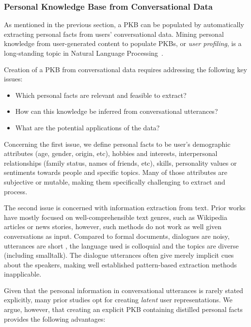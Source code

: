 \subsubsection{Personal Knowledge Base from Conversational Data}

As mentioned in the previous section, a PKB can be populated by automatically extracting personal facts from users' conversational data. Mining personal knowledge from user-generated content to populate PKBs, or \emph{user profiling}, is a long-standing topic in Natural Language Processing~\cite{flekova:ACL16:long,basile:2017}.

Creation of a PKB from conversational data requires addressing the following key issues:

\begin{itemize}
    \item Which personal facts are relevant and feasible to extract?
    \item How can this knowledge be inferred from conversational utterances?
    \item What are the potential applications of the data?
\end{itemize}

Concerning the first issue, we define personal facts to be user's demographic attributes (age, gender, origin, etc), hobbies and interests, interpersonal relationships (family status, names of friends, etc), skills, personality values or sentiments towards people and specific topics. Many of those attributes are subjective or mutable, making them specifically challenging to extract and process.

The second issue is concerned with information extraction from text. Prior works have mostly focused on well-comprehensible text genres,
such as Wikipedia articles or news stories, however, such methods do not work as well given conversations as input.
Compared to formal documents, dialogues are noisy, utterances are short \cite{bontcheva2014making}, the language used is
colloquial and the topics are diverse (including smalltalk). The dialogue utterances often give merely implicit cues about the speakers, making well established pattern-based extraction methods inapplicable.

Given that the personal information in conversational utterances is rarely stated explicitly, many prior studies opt for creating \textit{latent} user representations. We argue, however, that creating an explicit PKB containing distilled personal facts provides the following advantages:


